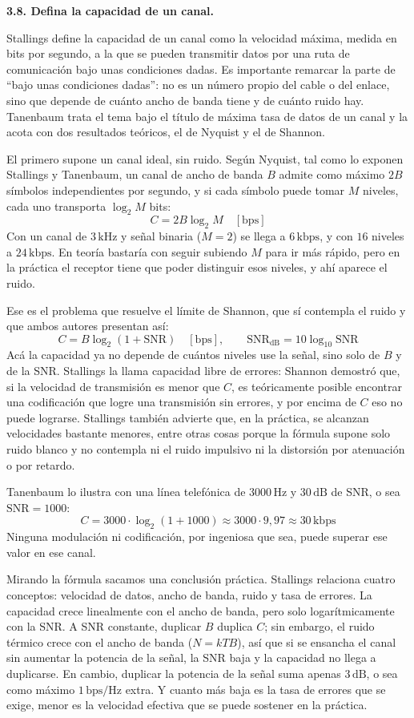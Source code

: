\documentclass[11pt,a4paper]{article}
\begin{document}
\vspace{0.3cm}
\noindent\textbf{3.8. Defina la capacidad de un canal.}\par
Stallings define la capacidad de un canal como la velocidad máxima, medida en bits por segundo, a la que se pueden transmitir datos por una ruta de comunicación bajo unas condiciones dadas. Es importante remarcar la parte de ``bajo unas condiciones dadas'': no es un número propio del cable o del enlace, sino que depende de cuánto ancho de banda tiene y de cuánto ruido hay. Tanenbaum trata el tema bajo el título de máxima tasa de datos de un canal y la acota con dos resultados teóricos, el de Nyquist y el de Shannon.

El primero supone un canal ideal, sin ruido. Según Nyquist, tal como lo exponen Stallings y Tanenbaum, un canal de ancho de banda $B$ admite como máximo $2B$ símbolos independientes por segundo, y si cada símbolo puede tomar $M$ niveles, cada uno transporta $\log_2 M$ bits:
\[
  C = 2B\log_2 M \quad [\mathrm{bps}]
\]
Con un canal de $3\,\mathrm{kHz}$ y señal binaria ($M=2$) se llega a $6\,\mathrm{kbps}$, y con $16$ niveles a $24\,\mathrm{kbps}$. En teoría bastaría con seguir subiendo $M$ para ir más rápido, pero en la práctica el receptor tiene que poder distinguir esos niveles, y ahí aparece el ruido.

Ese es el problema que resuelve el límite de Shannon, que sí contempla el ruido y que ambos autores presentan así:
\[
  C = B\log_2\!\left(1+\mathrm{SNR}\right) \quad [\mathrm{bps}],
  \qquad \mathrm{SNR}_{\mathrm{dB}} = 10\log_{10}\mathrm{SNR}
\]
Acá la capacidad ya no depende de cuántos niveles use la señal, sino solo de $B$ y de la SNR. Stallings la llama capacidad libre de errores: Shannon demostró que, si la velocidad de transmisión es menor que $C$, es teóricamente posible encontrar una codificación que logre una transmisión sin errores, y por encima de $C$ eso no puede lograrse. Stallings también advierte que, en la práctica, se alcanzan velocidades bastante menores, entre otras cosas porque la fórmula supone solo ruido blanco y no contempla ni el ruido impulsivo ni la distorsión por atenuación o por retardo.

Tanenbaum lo ilustra con una línea telefónica de $3000\,\mathrm{Hz}$ y $30\,\mathrm{dB}$ de SNR, o sea $\mathrm{SNR}=1000$:
\[
  C = 3000\cdot\log_2(1+1000)\approx 3000\cdot 9{,}97\approx 30\,\mathrm{kbps}
\]
Ninguna modulación ni codificación, por ingeniosa que sea, puede superar ese valor en ese canal.

Mirando la fórmula sacamos una conclusión práctica. Stallings relaciona cuatro conceptos: velocidad de datos, ancho de banda, ruido y tasa de errores. La capacidad crece linealmente con el ancho de banda, pero solo logarítmicamente con la SNR. A SNR constante, duplicar $B$ duplica $C$; sin embargo, el ruido térmico crece con el ancho de banda ($N=kTB$), así que si se ensancha el canal sin aumentar la potencia de la señal, la SNR baja y la capacidad no llega a duplicarse. En cambio, duplicar la potencia de la señal suma apenas $3\,\mathrm{dB}$, o sea como máximo $1\,\mathrm{bps/Hz}$ extra. Y cuanto más baja es la tasa de errores que se exige, menor es la velocidad efectiva que se puede sostener en la práctica.
\end{document}
